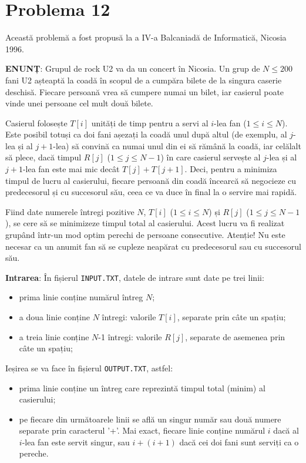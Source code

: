 \section{Problema 12}

Această problemă a fost propusă la a IV-a Balcaniadă de Informatică, Nicosia
1996.

{\bf ENUNȚ}: Grupul de rock U2 va da un concert în Nicosia. Un grup de $N \leq
200$ fani U2 așteaptă la coadă în scopul de a cumpăra bilete de la singura
caserie deschisă. Fiecare persoană vrea să cumpere numai un bilet, iar
casierul poate vinde unei persoane cel mult două bilete.

Casierul folosește $T[i]$ unități de timp pentru a servi al $i$-lea fan ($1
\leq i \leq N$). Este posibil totuși ca doi fani așezați la coadă unul după
altul (de exemplu, al $j$-lea și al $j+1$-lea) să convină ca numai unul din ei
să rămână la coadă, iar celălalt să plece, dacă timpul $R[j]$ ($1 \leq j \leq
N-1$) în care casierul servește al $j$-lea și al $j+1$-lea fan este mai mic
decât $T[j]+T[j+1]$. Deci, pentru a minimiza timpul de lucru al casierului,
fiecare persoană din coadă încearcă să negocieze cu predecesorul și cu
succesorul său, ceea ce va duce în final la o servire mai rapidă.

Fiind date numerele întregi pozitive $N$, $T[i]$ ($1 \leq i \leq N$) și $R[j]$
($1 \leq j \leq N-1$), se cere să se minimizeze timpul total al
casierului. Acest lucru va fi realizat grupând într-un mod optim perechi de
persoane consecutive. Atenție! Nu este necesar ca un anumit fan să se cupleze
neapărat cu predecesorul sau cu succesorul său.

{\bf Intrarea}: În fișierul {\tt INPUT.TXT}, datele de intrare sunt date pe
trei linii:

\begin{itemize}

\item prima linie conține numărul întreg $N$;

\item a doua linie conține $N$ întregi: valorile $T[i]$, separate prin câte un
  spațiu;

\item a treia linie conține $N$-1 întregi: valorile $R[j]$, separate de
  asemenea prin câte un spațiu;

\end{itemize}

Ieșirea se va face în fișierul {\tt OUTPUT.TXT}, astfel:

\begin{itemize}

\item prima linie conține un întreg care reprezintă timpul total (minim) al
  casierului;

\item pe fiecare din următoarele linii se află un singur număr sau două numere
  separate prin caracterul '+'. Mai exact, fiecare linie conține numărul $i$
  dacă al $i$-lea fan este servit singur, sau $i+(i+1)$ dacă cei doi fani sunt
  serviți ca o pereche.

\end{itemize}

